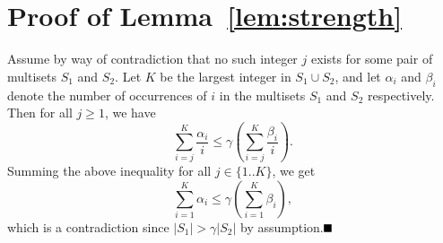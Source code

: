 \documentclass[11pt]{article}
\newcommand{\qed}{\mbox{}\hspace*{\fill}\nolinebreak\mbox{$\rule{0.6em}{0.6em}$}
}
\begin{document}
\section{Proof of Lemma~\ref{lem:strength}}
\label{append:strength}
Assume by way of contradiction that no such integer $j$ exists for some pair
of multisets $S_1$ and $S_2$.  Let $K$ be the largest integer in $S_1 \cup
S_2$, and let $\alpha_i$ and $\beta_i$ denote the number of occurrences of $i$
in the multisets $S_1$ and $S_2$ respectively.  Then for all $j \geq 1$, we
have $$ \sum_{i=j}^{K} {\frac{\alpha_i}{i}} \le \gamma \left( \sum_{i =j}^{K}
  {\frac{\beta_i}{i}} \right).$$ Summing the above inequality for all $j \in
\{1..K\}$, we get $$\sum_{i=1}^{K} {\alpha_i} \le \gamma \left( \sum_{i
    =1}^{K}{\beta_i} \right),$$ which is a contradiction since $|S_1| > \gamma
|S_2|$ by assumption.$\qed$
\end{document}
